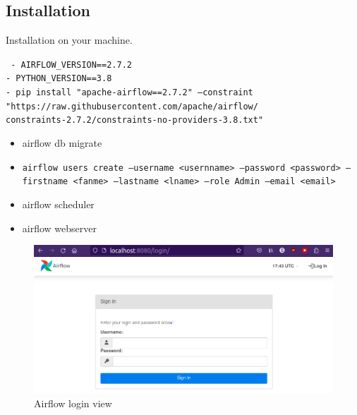 \documentclass[14pt, aspectratio=169]{beamer}
\begin{document}
	\subsection{Installation}
	\begin{frame}{Installation}
		\href{https://airflow.apache.org/docs/apache-airflow/stable/start.html}{} on your machine.		
		\begin{example}
			\texttt{
			- AIRFLOW\_VERSION==2.7.2\\
		    - PYTHON\_VERSION==3.8 \\
		    - pip install "apache-airflow==2.7.2" --constraint\\ 
			 "https://raw.githubusercontent.com/apache/airflow/ \\
			 constraints-2.7.2/constraints-no-providers-3.8.txt"
			}
		\end{example}
		\href{https://raw.githubusercontent.com/apache/airflow/constraints-2.7.3/constraints-3.8.txt}{}
	\end{frame}

	\begin{frame}
		\begin{itemize}
			\item airflow db migrate
			\item \texttt{airflow users create --username <usernname> --password <password> --firstname <fanme> --lastname <lname> --role Admin --email <email>}
			\item airflow scheduler
			\item airflow webserver
		\end{itemize}
	\end{frame}

	\begin{frame}
		\begin{figure}
			\centering
			\includegraphics[width=14cm]{airflow-login.png}
			\caption{Airflow login view}
		\end{figure}
	\end{frame}
	
\end{document}
